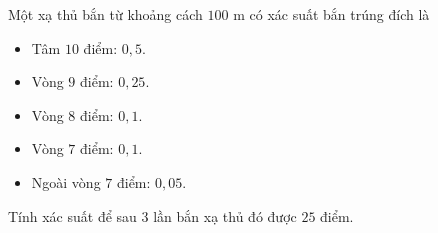 \begin{bt}%

	Một xạ thủ bắn từ khoảng cách $100$ m có xác suất bắn trúng đích là
	\begin{itemize}
		\item Tâm $10$ điểm: $0{,}5$.
		\item  Vòng $9$ điểm: $0{,}25$.
		\item Vòng $8$ điểm: $0{,}1$.
		\item Vòng $7$ điểm: $0{,}1$.
		\item Ngoài vòng $7$ điểm: $0{,}05$.
	\end{itemize}
	Tính xác suất để sau $3$ lần bắn xạ thủ đó được $25$ điểm.
\end{bt}

